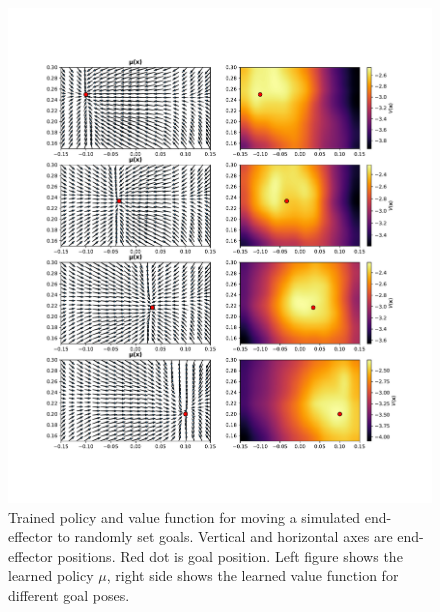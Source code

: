 \begin{figure}[h]
    \centering
    \includegraphics[width=\textwidth]{res/moving_goal_summary.pdf}

    \caption{Trained policy and value function for moving a simulated
    end-effector to randomly set goals. Vertical and horizontal axes are
    end-effector positions. Red dot is goal position. Left figure shows the
    learned policy $\mu$, right side shows the learned value function for
    different goal poses.}

    \label{fig:sim_moving_goal}
    
\end{figure}
